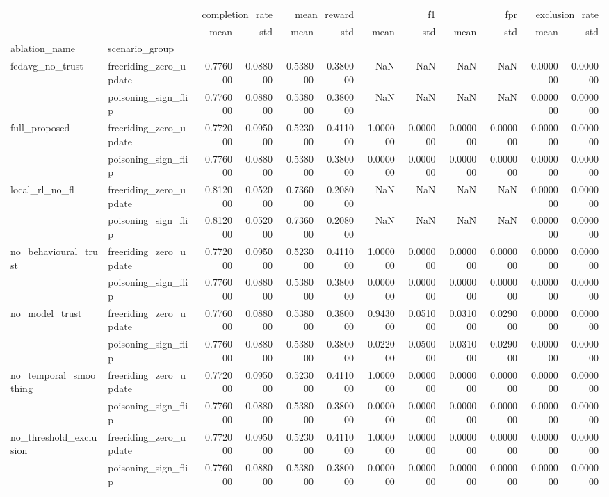\begin{tabular}{llrrrrrrrrrr}
\toprule
 &  & \multicolumn{2}{r}{completion_rate} & \multicolumn{2}{r}{mean_reward} & \multicolumn{2}{r}{f1} & \multicolumn{2}{r}{fpr} & \multicolumn{2}{r}{exclusion_rate} \\
 &  & mean & std & mean & std & mean & std & mean & std & mean & std \\
ablation_name & scenario_group &  &  &  &  &  &  &  &  &  &  \\
\midrule
\multirow[t]{2}{*}{fedavg_no_trust} & freeriding_zero_update & 0.776000 & 0.088000 & 0.538000 & 0.380000 & NaN & NaN & NaN & NaN & 0.000000 & 0.000000 \\
 & poisoning_sign_flip & 0.776000 & 0.088000 & 0.538000 & 0.380000 & NaN & NaN & NaN & NaN & 0.000000 & 0.000000 \\
\cline{1-12}
\multirow[t]{2}{*}{full_proposed} & freeriding_zero_update & 0.772000 & 0.095000 & 0.523000 & 0.411000 & 1.000000 & 0.000000 & 0.000000 & 0.000000 & 0.000000 & 0.000000 \\
 & poisoning_sign_flip & 0.776000 & 0.088000 & 0.538000 & 0.380000 & 0.000000 & 0.000000 & 0.000000 & 0.000000 & 0.000000 & 0.000000 \\
\cline{1-12}
\multirow[t]{2}{*}{local_rl_no_fl} & freeriding_zero_update & 0.812000 & 0.052000 & 0.736000 & 0.208000 & NaN & NaN & NaN & NaN & 0.000000 & 0.000000 \\
 & poisoning_sign_flip & 0.812000 & 0.052000 & 0.736000 & 0.208000 & NaN & NaN & NaN & NaN & 0.000000 & 0.000000 \\
\cline{1-12}
\multirow[t]{2}{*}{no_behavioural_trust} & freeriding_zero_update & 0.772000 & 0.095000 & 0.523000 & 0.411000 & 1.000000 & 0.000000 & 0.000000 & 0.000000 & 0.000000 & 0.000000 \\
 & poisoning_sign_flip & 0.776000 & 0.088000 & 0.538000 & 0.380000 & 0.000000 & 0.000000 & 0.000000 & 0.000000 & 0.000000 & 0.000000 \\
\cline{1-12}
\multirow[t]{2}{*}{no_model_trust} & freeriding_zero_update & 0.776000 & 0.088000 & 0.538000 & 0.380000 & 0.943000 & 0.051000 & 0.031000 & 0.029000 & 0.000000 & 0.000000 \\
 & poisoning_sign_flip & 0.776000 & 0.088000 & 0.538000 & 0.380000 & 0.022000 & 0.050000 & 0.031000 & 0.029000 & 0.000000 & 0.000000 \\
\cline{1-12}
\multirow[t]{2}{*}{no_temporal_smoothing} & freeriding_zero_update & 0.772000 & 0.095000 & 0.523000 & 0.411000 & 1.000000 & 0.000000 & 0.000000 & 0.000000 & 0.000000 & 0.000000 \\
 & poisoning_sign_flip & 0.776000 & 0.088000 & 0.538000 & 0.380000 & 0.000000 & 0.000000 & 0.000000 & 0.000000 & 0.000000 & 0.000000 \\
\cline{1-12}
\multirow[t]{2}{*}{no_threshold_exclusion} & freeriding_zero_update & 0.772000 & 0.095000 & 0.523000 & 0.411000 & 1.000000 & 0.000000 & 0.000000 & 0.000000 & 0.000000 & 0.000000 \\
 & poisoning_sign_flip & 0.776000 & 0.088000 & 0.538000 & 0.380000 & 0.000000 & 0.000000 & 0.000000 & 0.000000 & 0.000000 & 0.000000 \\
\cline{1-12}
\bottomrule
\end{tabular}
